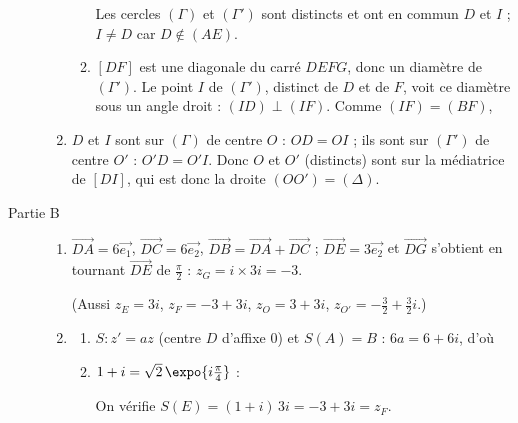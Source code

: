 \begin{description}
\begin{enumerate}
\begin{enumerate}
				Les cercles $(\Gamma)$ et $(\Gamma')$ sont distincts et ont en commun $D$ et $I$ ; $I \neq D$ car $D \notin (AE)$.
				\par\noindent{}
			\item {}
				$[DF]$ est une diagonale du carré $DEFG$, donc un diamètre de $(\Gamma')$. Le point $I$ de $(\Gamma')$, distinct de $D$ et de $F$,
				voit ce diamètre sous un angle droit : $(ID) \perp (IF)$. Comme $(IF) = (BF)$,
				\par\noindent{}
		\end{enumerate}
		\item {}
			$D$ et $I$ sont sur $(\Gamma)$ de centre $O$ : $OD = OI$ ; ils sont sur $(\Gamma')$ de centre $O'$ : $O'D = O'I$.
			Donc $O$ et $O'$ (distincts) sont sur la médiatrice de $[DI]$, qui est donc la droite $(OO') = (\Delta)$.
			\par\noindent{}
	\end{enumerate}
	\item[Partie B]
	\begin{enumerate}
		\item {}
			$\overrightarrow{DA} = 6\vec{e_1}$, $\overrightarrow{DC} = 6\vec{e_2}$, $\overrightarrow{DB} = \overrightarrow{DA} + \overrightarrow{DC}$ ;
			$\overrightarrow{DE} = 3\vec{e_2}$ et $\overrightarrow{DG}$ s'obtient en tournant $\overrightarrow{DE}$ de $\frac{\pi}{2}$ : $z_G = i \times 3i = -3$.
			\par\noindent{}
			(Aussi $z_E = 3i$, $z_F = -3 + 3i$, $z_O = 3 + 3i$, $z_{O'} = -\frac{3}{2} + \frac{3}{2} i$.)
		\item
		\begin{enumerate}
			\item {}
				$S : z' = az$ (centre $D$ d'affixe $0$) et $S(A) = B$ : $6a = 6 + 6i$, d'où \par\noindent{}
			\item {}
				$1 + i = \sqrt{2}\, \expo{i\frac{\pi}{4}}$ : \par\noindent{}
				On vérifie $S(E) = (1+i)\,3i = -3 + 3i = z_F$.

\end{enumerate}
\end{enumerate}
\end{description}
